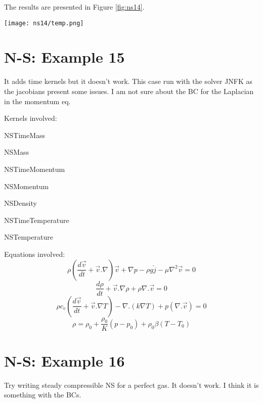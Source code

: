 \documentclass[11pt,letterpaper]{article}
\begin{document}
The results are presented in Figure \ref{fig:ns14}.
\begin{figure*}[!h]
	\centering
	\texttt{[image: ns14/temp.png]}
	\hfill
	\caption{Temperature.}
	\label{fig:ns14}
\end{figure*}

\section{N-S: Example 15}

It adds time kernels but it doesn't work.
This case run with the solver JNFK as the jacobians present some issues.
I am not sure about the BC for the Laplacian in the momentum eq.

Kernels involved:
\begin{description}[font=$\bullet$\scshape\bfseries]
	\item[] NSTimeMass
	\item[] NSMass
	\item[] NSTimeMomentum
	\item[] NSMomentum
	\item[] NSDensity
	\item[] NSTimeTemperature
	\item[] NSTemperature
\end{description}

Equations involved:
\begin{equation}
\rho (\frac{d\vec{v}}{dt} + \vec{v}.\nabla)\vec{v} + \nabla p - \rho g \check{j} - \mu \nabla^{2}\vec{v} = 0
\end{equation}
\begin{equation}
\frac{d\rho}{dt} + \vec{v}.\nabla\rho+\rho\nabla.\vec{v}=0
\end{equation}
\begin{equation}
\rho c_{v} (\frac{d\vec{v}}{dt} + \vec{v}.\nabla T) - \nabla .(k\nabla T) + p (\nabla . \vec{v})= 0
\end{equation}
\begin{equation}
\rho = \rho_{0} + \frac{\rho_{0}}{K}(p-p_{0}) + \rho_{0}\beta(T-T_{0})
\end{equation}

\section{N-S: Example 16}

Try writing steady compressible NS for a perfect gas. It doesn't work. I think it is something with the BCs.
\end{document}
